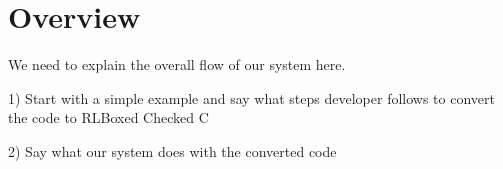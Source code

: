 \section{Overview}
\label{sec:overview}
We need to explain the overall flow of our system here.

1) Start with a simple example and say what steps developer follows to convert the code to RLBoxed Checked C

2) Say what our system does with the converted code



